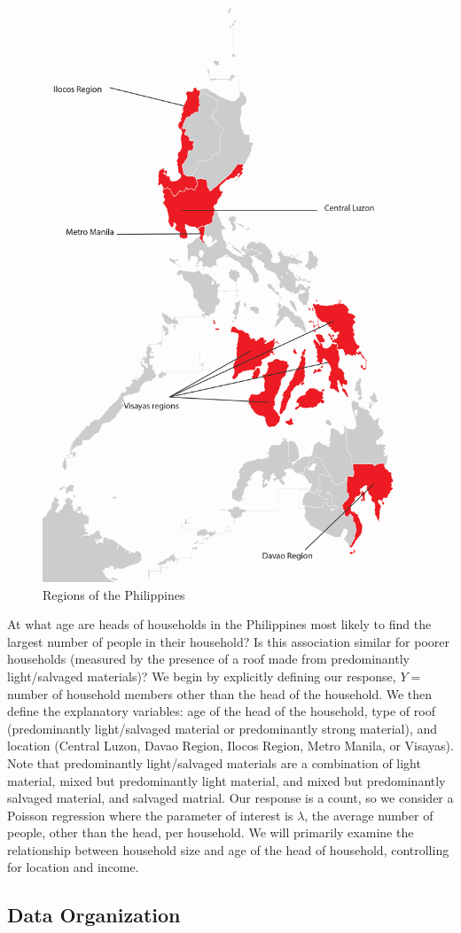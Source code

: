 \documentclass[
]{krantz}
\begin{document}
\begin{figure}
\includegraphics[width=0.5\linewidth]{data/map_of_philippines} \caption{Regions of the Philippines}\label{fig:philippinesmap}
\end{figure}

At what age are heads of households in the Philippines most likely to find the largest number of people in their household? Is this association similar for poorer households (measured by the presence of a roof made from predominantly light/salvaged materials)? We begin by explicitly defining our response, \(Y=\) number of household members other than the head of the household. We then define the explanatory variables: age of the head of the household, type of roof (predominantly light/salvaged material or predominantly strong material), and location (Central Luzon, Davao Region, Ilocos Region, Metro Manila, or Visayas). Note that predominantly light/salvaged materials are a combination of light material, mixed but predominantly light material, and mixed but predominantly salvaged material, and salvaged matrial. Our response is a count, so we consider a Poisson regression where the parameter of interest is \(\lambda\), the average number of people, other than the head, per household. We will primarily examine the relationship between household size and age of the head of household, controlling for location and income.

\hypertarget{organizedata4}{%
\subsection{Data Organization}\label{organizedata4}}
\end{document}
